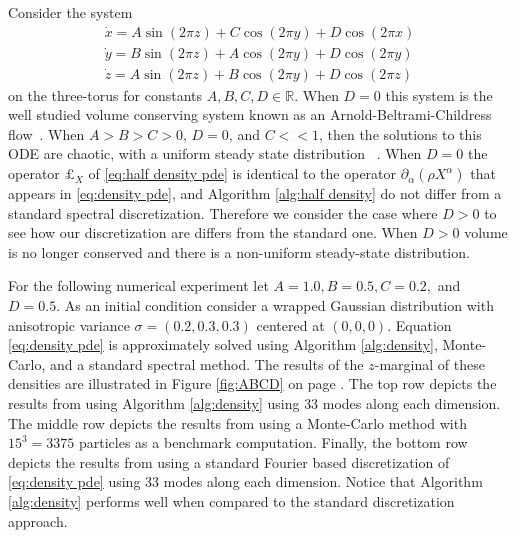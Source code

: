 \documentclass[final,leqno]{siamart}
\begin{document}
Consider the system
\begin{align*}
	\dot{x} = A \sin( 2\pi z) + C \cos(2\pi y)  + D \cos(2\pi x)\\
	\dot{y} = B \sin( 2\pi z) + A \cos(2\pi y)  + D \cos(2\pi y)\\
	\dot{z} = A \sin( 2\pi z) + B \cos(2\pi y)  + D \cos(2\pi z)
\end{align*}
on the three-torus for constants $A,B,C,D \in \mathbb{R}$.  
When $D=0$ this system is the well studied volume conserving system known as an Arnold-Beltrami-Childress flow~\cite{ArnoldKhesin1992}.
When $A > B > C > 0$, $D=0$, and $C << 1$, then the solutions to this ODE are chaotic, with a uniform steady state distribution ~\cite{MajdaBertozzi2002}.
When $D=0$ the operator $\pounds_{X}$ of \eqref{eq:half density pde} is identical to the operator $\partial_{\alpha}( \rho X^{\alpha})$ that appears in \eqref{eq:density pde}, and Algorithm \ref{alg:half density} do not differ from a standard spectral discretization.
Therefore we consider the case where $D > 0$ to see how our discretization are differs from the standard one.
When $D> 0$ volume is no longer conserved and there is a non-uniform steady-state distribution.

For the following numerical experiment let $A=1.0,B=0.5,C=0.2,$ and $D=0.5$.
As an initial condition consider a wrapped Gaussian distribution with anisotropic variance $\sigma= (0.2, 0.3, 0.3)$ centered at $(0,0,0)$.
Equation \eqref{eq:density pde} is approximately solved using Algorithm \ref{alg:density}, Monte-Carlo, and a standard spectral method.
The results of the $z$-marginal of these densities are illustrated in Figure \ref{fig:ABCD} on page \pageref{fig:ABCD}.
The top row depicts the results from using Algorithm \ref{alg:density} using $33$ modes along each dimension.
The middle row depicts the results from using a Monte-Carlo method with $15^{3} = 3375$ particles as a benchmark computation.
Finally, the bottom row depicts the results from using a standard Fourier based discretization of \eqref{eq:density pde} using 33 modes along each dimension.
Notice that Algorithm \ref{alg:density} performs well when compared to the standard discretization approach.
\end{document}
